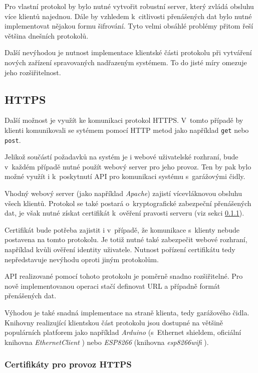 Pro vlastní protokol by bylo nutné vytvořit robustní server, který zvládá obsluhu více klientů najednou. Dále by vzhledem k~citlivosti přenášených dat bylo nutné implementovat nějakou formu šifrování. Tyto velmi obsáhlé problémy přitom řeší většina dnešních protokolů.

Další nevýhodou je nutnost implementace klientské části protokolu při vytváření nových zařízení spravovaných nadřazeným systémem. To do jisté míry omezuje jeho rozšiřitelnost.

\subsection{HTTPS}
\label{sec:an_https}

Další možnost je využít ke komunikaci protokol HTTPS. V~tomto případě by klienti komunikovali se sytémem pomocí HTTP metod jako například \verb|get| nebo \verb|post|.

Jelikož součástí požadavků na systém je i webové uživatelské rozhraní, bude v~každém případě nutné použít webový server pro jeho provoz. Ten by pak bylo možné využít i k~poskytnutí API pro komunikaci systému s~garážovými čidly.

Vhodný webový server (jako například \textit{Apache}) zajistí vícevláknovou obsluhu všech klientů. Protokol se také postará o~kryptografické zabezpeční přenášených dat, je však nutné získat certifikát k~ověření pravosti serveru (viz sekci \ref{sec:an_certs}).

Certifikát bude potřeba zajistit i v~případě, že komunikace s~klienty nebude postavena na tomto protokolu. Je totiž nutné také zabezpečit webové rozhraní, například kvůli ověření identity uživatele. Nutnost pořízení certifikátu tedy nepředstavuje nevýhodu oproti jiným protokolům. 

API realizované pomocí tohoto protokolu je poměrně snadno rozšiřitelné. Pro nově implementovanou operaci stačí definovat URL a případně formát přenášených dat.

Výhodou je také snadná implementace na straně klienta, tedy garážového čidla. Knihovny realizující klientskou část protokolu jsou dostupné na většině populárních platforem jako například \textit{Arduino} (s~Ethernet shieldem, oficiální knihovna \textit{EthernetClient} \cite{ard_web}) nebo \textit{ESP8266} (knihovna \textit{esp8266wifi} \cite{esp_web}).

\subsubsection{Certifikáty pro provoz HTTPS}
\label{sec:an_certs}

